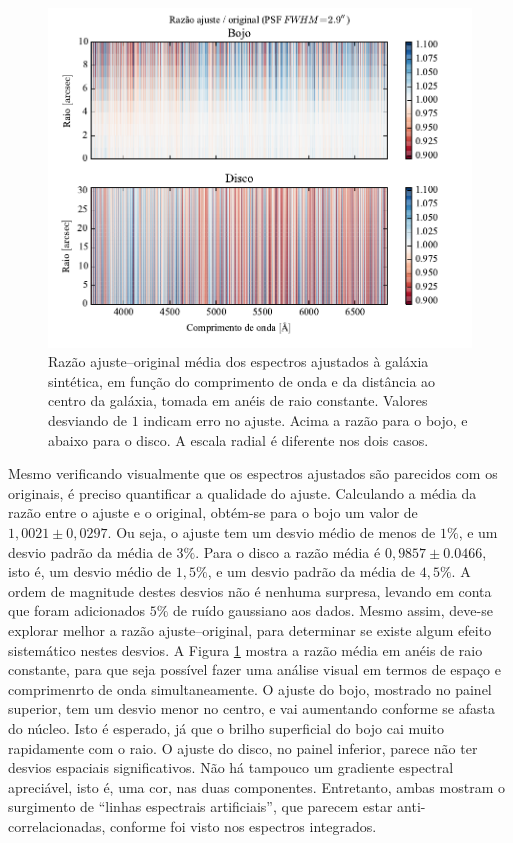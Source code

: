 \begin{figure}
	\includegraphics{figuras/simulation_error}
	\caption[Razão ajuste--original dos espectros ajustados à galáxia sintética.]
	{Razão ajuste--original média dos espectros ajustados à galáxia sintética, em
	função do comprimento de onda e da distância ao centro da galáxia, tomada em
	anéis de raio constante. Valores desviando de $1$ indicam erro no ajuste.
	Acima a razão para o bojo, e abaixo para o disco. A escala radial é
	diferente nos dois casos.}
	\label{fig:testFitError}
\end{figure}

Mesmo verificando visualmente que os espectros ajustados são parecidos com os
originais, é preciso quantificar a qualidade do ajuste. Calculando a média da
razão entre o ajuste e o original, obtém-se para o bojo um valor de $1,0021 \pm
0,0297$. Ou seja, o ajuste tem um desvio médio de menos de $1\%$, e um desvio
padrão da média de $3\%$. Para o disco a razão média é $0,9857 \pm 0.0466$, isto
é, um desvio médio de $1,5\%$, e um desvio padrão da média de $4,5\%$. A ordem
de magnitude destes desvios não é nenhuma surpresa, levando em conta que foram
adicionados $5\%$ de ruído gaussiano aos dados. Mesmo assim, deve-se explorar
melhor a razão ajuste--original, para determinar se existe algum efeito
sistemático nestes desvios. A Figura \ref{fig:testFitError} mostra a razão média
em anéis de raio constante, para que seja possível fazer uma análise visual em
termos de espaço e comprimenrto de onda simultaneamente. O ajuste do bojo,
mostrado no painel superior, tem um desvio menor no centro, e vai aumentando
conforme se afasta do núcleo. Isto é esperado, já que o brilho superficial do
bojo cai muito rapidamente com o raio. O ajuste do disco, no painel inferior,
parece não ter desvios espaciais significativos.
Não há tampouco um gradiente espectral apreciável, isto é, uma cor, nas duas
componentes. Entretanto, ambas mostram o surgimento de ``linhas espectrais
artificiais'', que parecem estar anti-correlacionadas, conforme foi visto nos
espectros integrados.

